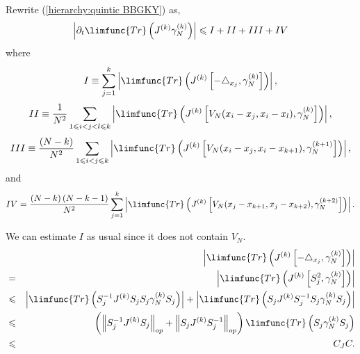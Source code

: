 \documentclass[12pt,letterpaper,leqno]{amsart}
\theoremstyle{plain}
\numberwithin{equation}{section}
\numberwithin{theorem}{section}
\numberwithin{proposition}{section}
\numberwithin{lemma}{section}
\numberwithin{corollary}{section}
\begin{document}
Rewrite (\ref{hierarchy:quintic BBGKY}) as, 
\begin{equation*}
\left\vert \partial _{t}\limfunc{Tr}\left( J^{(k)}\gamma _{N}^{(k)}\right)
\right\vert \leqslant I+II+III+IV
\end{equation*}%
where%
\begin{equation*}
I\equiv \sum_{j=1}^{k}\left\vert \limfunc{Tr}\left( J^{(k)}\left[
-\bigtriangleup _{x_{j}},\gamma _{N}^{(k)}\right] \right) \right\vert ,
\end{equation*}%
\begin{equation*}
II\equiv \frac{1}{N^{2}}\sum_{1\leqslant i<j<l\leqslant k}\left\vert 
\limfunc{Tr}\left( J^{(k)}\left[ V_{N}(x_{i}-x_{j},x_{i}-x_{l}),\gamma
_{N}^{(k)}\right] \right) \right\vert ,
\end{equation*}%
\begin{equation*}
III\equiv \frac{(N-k)}{N^{2}}\sum_{1\leqslant i<j\leqslant k}\left\vert 
\limfunc{Tr}\left( J^{(k)}\left[ V_{N}(x_{i}-x_{j},x_{i}-x_{k+1}),\gamma
_{N}^{(k+1)}\right] \right) \right\vert ,
\end{equation*}%
and%
\begin{equation*}
IV=\frac{\left( N-k\right) (N-k-1)}{N^{2}}\sum_{j=1}^{k}\left\vert \limfunc{%
Tr}\left( J^{(k)}\left[ V_{N}(x_{j}-x_{k+1},x_{j}-x_{k+2}),\gamma
_{N}^{(k+2)}\right] \right) \right\vert .
\end{equation*}

We can estimate $I$ as usual since it does not contain $V_{N}$.%
\begin{eqnarray*}
&&\left\vert \limfunc{Tr}\left( J^{(k)}\left[ -\bigtriangleup
_{x_{j}},\gamma _{N}^{(k)}\right] \right) \right\vert \\
&=&\left\vert \limfunc{Tr}\left( J^{(k)}\left[ S_{j}^{2},\gamma _{N}^{(k)}%
\right] \right) \right\vert \\
&\leqslant &\left\vert \limfunc{Tr}\left( S_{j}^{-1}J^{(k)}S_{j}S_{j}\gamma
_{N}^{(k)}S_{j}\right) \right\vert +\left\vert \limfunc{Tr}\left(
S_{j}J^{(k)}S_{j}^{-1}S_{j}\gamma _{N}^{(k)}S_{j}\right) \right\vert \\
&\leqslant &\left( \left\Vert S_{j}^{-1}J^{(k)}S_{j}\right\Vert
_{op}+\left\Vert S_{j}J^{(k)}S_{j}^{-1}\right\Vert _{op}\right) \limfunc{Tr}%
\left( S_{j}\gamma _{N}^{(k)}S_{j}\right) \\
&\leqslant &C_{J}C.
\end{eqnarray*}
\end{document}
